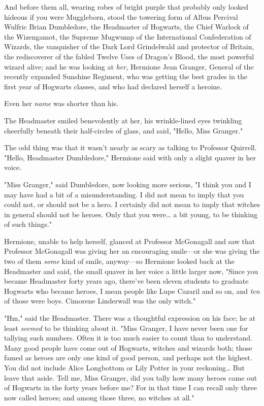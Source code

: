 And before them all, wearing robes of bright purple that probably only looked 
hideous if you were Muggleborn, stood the towering form of Albus Percival 
Wulfric Brian Dumbledore, the Headmaster of Hogwarts, the Chief Warlock of the 
Wizengamot, the Supreme Mugwump of the International Confederation of Wizards, 
the vanquisher of the Dark Lord Grindelwald and protector of Britain, the 
rediscoverer of the fabled Twelve Uses of Dragon's Blood, the most powerful 
wizard alive; and he was looking at \emph{her,} Hermione Jean Granger, General 
of the recently expanded Sunshine Regiment, who was getting the best grades in 
the first year of Hogwarts classes, and who had declared herself a heroine.

Even her \emph{name} was shorter than his.

The Headmaster smiled benevolently at her, his wrinkle-lined eyes twinkling 
cheerfully beneath their half-circles of glass, and said, "Hello, Miss Granger."

The odd thing was that it wasn't nearly as scary as talking to Professor 
Quirrell. "Hello, Headmaster Dumbledore," Hermione said with only a slight 
quaver in her voice.

"Miss Granger," said Dumbledore, now looking more serious, "I think you and I 
may have had a bit of a misunderstanding. I did not mean to imply that you 
could not, or should not be a hero. I certainly did not mean to imply that 
witches in general should not be heroes. Only that you were{\ldots} a bit 
young, to be thinking of such things."

Hermione, unable to help herself, glanced at Professor McGonagall and saw that 
Professor McGonagall was giving her an encouraging smile---or she was giving 
the two of them \emph{some} kind of smile, anyway---so Hermione looked back at 
the Headmaster and said, the small quaver in her voice a little larger now, 
"Since you became Headmaster forty years ago, there've been eleven students to 
graduate Hogwarts who became heroes, I mean people like Lupe Cazaril and so on, 
and \emph{ten} of those were boys. Cimorene Linderwall was the only witch."

"Hm," said the Headmaster. There was a thoughtful expression on his face; he at 
least \emph{seemed} to be thinking about it. "Miss Granger, I have never been 
one for tallying such numbers. Often it is too much easier to count than to 
understand. Many good people have come out of Hogwarts, witches and wizards 
both; those famed as heroes are only one kind of good person, and perhaps not 
the highest. You did not include Alice Longbottom or Lily Potter in your 
reckoning{\ldots} But leave that aside. Tell me, Miss Granger, did you tally 
how many heroes came out of Hogwarts in the forty years before me? For in that 
time I can recall only three now called heroes; and among those three, no 
witches at all."

